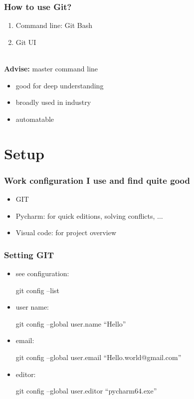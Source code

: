 \documentclass{beamer}
\begin{document}
	\begin{frame}[plain]
		\frametitle{How to use Git?}
		\begin{enumerate}
			\item Command line: Git Bash \\
			\item Git UI \\
		\end{enumerate}		

		~\linebreak \\

		\textbf{Advise:} master command line 
		\begin{itemize}
			\item good for deep understanding
			\item broadly used in industry
			\item automatable
		\end{itemize}
	\end{frame}

	\section{Setup}
    \begin{frame}[plain]
		\frametitle{Work configuration I use and find quite good}
		\begin{itemize}
			\item GIT 
			\item Pycharm: for quick editions, solving conflicts, $\dots$
			\item Visual code: for project overview
		\end{itemize}
		
	\end{frame}	

	\begin{frame}[plain]
		\frametitle{Setting GIT}

		\begin{itemize}
			\item see configuration: \\
			\begin{center}
				git config --list
			\end{center}
			\item user name: \\
			\begin{center}
				git config --global user.name ``Hello''
			\end{center}
			\item email: \\
			\begin{center}
				git config --global user.email ``Hello.world@gmail.com''
			\end{center}
			\item editor: \\
			\begin{center}
				git config --global user.editor ``pycharm64.exe''
			\end{center}
		\end{itemize}		
	\end{frame}
\end{document}
